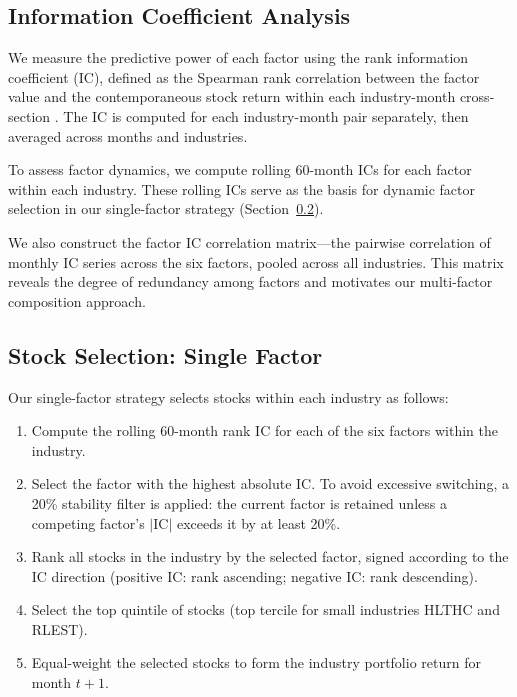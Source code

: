 \documentclass[12pt,a4paper]{article}
\begin{document}
\subsection{Information Coefficient Analysis}

We measure the predictive power of each factor using the rank information coefficient (IC), defined as the Spearman rank correlation between the factor value and the contemporaneous stock return within each industry-month cross-section \citep{grinold1989}. The IC is computed for each industry-month pair separately, then averaged across months and industries.

To assess factor dynamics, we compute rolling 60-month ICs for each factor within each industry. These rolling ICs serve as the basis for dynamic factor selection in our single-factor strategy (Section~\ref{sec:single_factor}).

We also construct the factor IC correlation matrix---the pairwise correlation of monthly IC series across the six factors, pooled across all industries. This matrix reveals the degree of redundancy among factors and motivates our multi-factor composition approach.

\subsection{Stock Selection: Single Factor}
\label{sec:single_factor}

Our single-factor strategy selects stocks within each industry as follows:

\begin{enumerate}
    \item Compute the rolling 60-month rank IC for each of the six factors within the industry.
    \item Select the factor with the highest absolute IC. To avoid excessive switching, a 20\% stability filter is applied: the current factor is retained unless a competing factor's $|$IC$|$ exceeds it by at least 20\%.
    \item Rank all stocks in the industry by the selected factor, signed according to the IC direction (positive IC: rank ascending; negative IC: rank descending).
    \item Select the top quintile of stocks (top tercile for small industries HLTHC and RLEST).
    \item Equal-weight the selected stocks to form the industry portfolio return for month $t+1$.
\end{enumerate}
\end{document}
